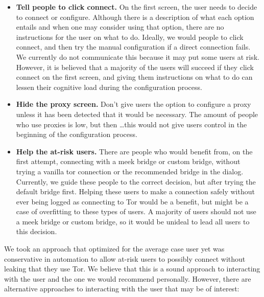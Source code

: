\documentclass[USenglish,oneside,twocolumn]{article}
\begin{document}
\begin{itemize}
\item {\bfseries Tell people to click connect.} On the first screen, the user needs to decide to connect or configure. Although there is a description of what each option entails and when one may consider using that option, there are no instructions for the user on what to do. Ideally, we would people to click connect, and then try the manual configuration if a direct connection fails. We currently do not communicate this because it may put some users at risk. However, it is believed that a majority of the users will succeed if they click connect on the first screen, and giving them instructions on what to do can lessen their cognitive load during the configuration process. 
\item{\bfseries Hide the proxy screen.} Don't give users the option to configure a proxy unless it has been detected that it would be necessary. The amount of people who use proxies is low, but then \ldots this would not give users control in the beginning of the configuration process. 
\item{\bfseries Help the at-risk users.} There are people who would benefit from, on the first attempt, connecting with a meek bridge or custom bridge, without trying a vanilla tor connection or the recommended bridge in the dialog. Currently, we guide these people to the correct decision, but after trying the default bridge first. Helping these users to make a connection safely without ever being logged as connecting to Tor would be a benefit, but might be a case of overfitting to these types of users. A majority of users should not use a meek bridge or custom bridge, so it would be unideal to lead all users to this decision.
\end{itemize} 

We took an approach that optimized for the average case user yet was conservative in automation to allow at-risk users to possibly connect without leaking that they use Tor. We believe that this is a sound approach to interacting with the user and the one we would recommend personally. However, there are alternative approaches to interacting with the user that may be of interest:  \\
\end{document}

